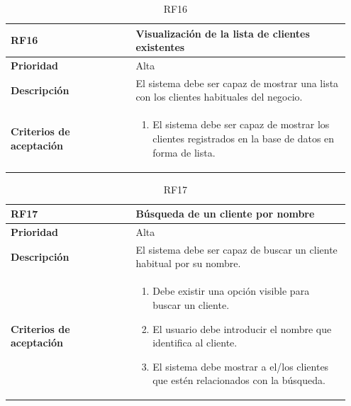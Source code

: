 \begin{table}[H]
	\centering %
	\begin{tabular}{|p{0.35\linewidth}|p{0.6\linewidth}|}
		\hline
		\rowcolor{grayshade} \textbf{RF16} & \textbf{Visualización de la lista de clientes existentes} \\
		\hline
		\textbf{Prioridad} & Alta \\
		\hline
		\textbf{Descripción} & El sistema debe ser capaz de mostrar una lista con los clientes habituales del negocio.\\
		\hline
		\vspace{0.5mm}
		\textbf{Criterios de aceptación} & 
		\begin{minipage}[t]{0.9\linewidth}
			\begin{enumerate}
				\item El sistema debe ser capaz de mostrar los clientes registrados en la base de datos en forma de lista. 
			\end{enumerate}
			\vspace{2mm}
		\end{minipage} \\
		\hline
	\end{tabular}
	\caption{RF16}
\end{table}

\begin{table}[H]
	\centering %
	\begin{tabular}{|p{0.35\linewidth}|p{0.6\linewidth}|}
		\hline
		\rowcolor{grayshade} \textbf{RF17} & \textbf{Búsqueda de un cliente por nombre} \\
		\hline
		\textbf{Prioridad} & Alta \\
		\hline
		\textbf{Descripción} & El sistema debe ser capaz de buscar un cliente habitual por su nombre.\\
		\hline
		\vspace{0.5mm}
		\textbf{Criterios de aceptación} & 
		\begin{minipage}[t]{0.9\linewidth}
			\begin{enumerate}
				\item Debe existir una opción visible para buscar un cliente.
				\item El usuario debe introducir el nombre que identifica al cliente. 
				\item El sistema debe mostrar a el/los clientes que estén relacionados con la búsqueda.  
			\end{enumerate}
			\vspace{2mm}
		\end{minipage} \\
		\hline
	\end{tabular}
	\caption{RF17}
\end{table}

